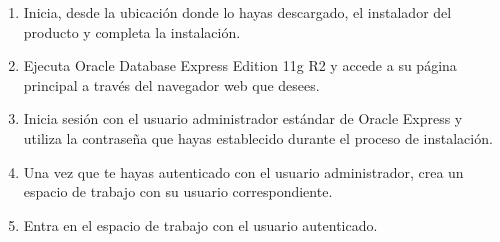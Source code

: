 \begin{itemize}
\begin{enumerate}
\begin{itemize}
        \end{itemize}
    \item Inicia, desde la ubicación donde lo hayas descargado, el instalador del producto y completa la instalación.
    \item Ejecuta Oracle Database Express Edition 11g R2 y accede a su página principal a través del navegador web que desees.
    \item Inicia sesión con el usuario administrador estándar de Oracle Express y utiliza la contraseña que hayas establecido durante el proceso de instalación.
    \item Una vez que te hayas autenticado con el usuario administrador, crea un espacio de trabajo con su usuario correspondiente.
    \item Entra en el espacio de trabajo con el usuario autenticado.
    \end{enumerate}
\end{itemize}



%
%

